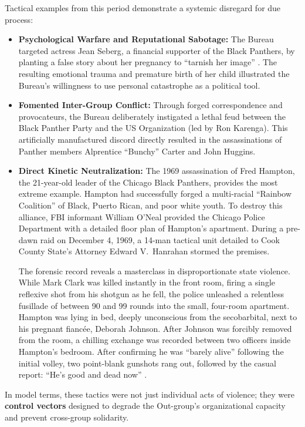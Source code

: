 \documentclass[12pt,openany]{book}
\begin{document}
Tactical examples from this period demonstrate a systemic disregard for due process:
\begin{itemize}
    \item \textbf{Psychological Warfare and Reputational Sabotage:} The Bureau targeted actress Jean Seberg, a financial supporter of the Black Panthers, by planting a false story about her pregnancy to ``tarnish her image'' \cite{fbi_cointelpro_vault}. The resulting emotional trauma and premature birth of her child illustrated the Bureau's willingness to use personal catastrophe as a political tool.
    \item \textbf{Fomented Inter-Group Conflict:} Through forged correspondence and provocateurs, the Bureau deliberately instigated a lethal feud between the Black Panther Party and the US Organization (led by Ron Karenga). This artificially manufactured discord directly resulted in the assassinations of Panther members Alprentice ``Bunchy'' Carter and John Huggins.
    \item \textbf{Direct Kinetic Neutralization:} The 1969 assassination of Fred Hampton, the 21-year-old leader of the Chicago Black Panthers, provides the most extreme example. Hampton had successfully forged a multi-racial ``Rainbow Coalition'' of Black, Puerto Rican, and poor white youth. To destroy this alliance, FBI informant William O'Neal provided the Chicago Police Department with a detailed floor plan of Hampton's apartment. During a pre-dawn raid on December 4, 1969, a 14-man tactical unit detailed to Cook County State's Attorney Edward V.\ Hanrahan stormed the premises.

    The forensic record reveals a masterclass in disproportionate state violence. While Mark Clark was killed instantly in the front room, firing a single reflexive shot from his shotgun as he fell, the police unleashed a relentless fusillade of between 90 and 99 rounds into the small, four-room apartment. Hampton was lying in bed, deeply unconscious from the secobarbital, next to his pregnant fianc\'{e}e, Deborah Johnson. After Johnson was forcibly removed from the room, a chilling exchange was recorded between two officers inside Hampton's bedroom. After confirming he was ``barely alive'' following the initial volley, two point-blank gunshots rang out, followed by the casual report: ``He's good and dead now'' \cite{hampton_bio}.
\end{itemize}

In model terms, these tactics were not just individual acts of violence; they were \textbf{control vectors} designed to degrade the Out-group's organizational capacity and prevent cross-group solidarity.
\end{document}
